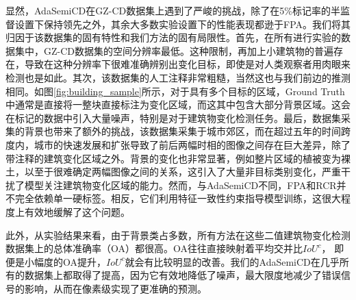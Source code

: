 \documentclass[lang=chs, degree=master, blindreview=false, adobe=false]{yanputhesis}
\begin{document}
显然，AdaSemiCD在GZ-CD数据集上遇到了严峻的挑战，除了在5$\%$标记率的半监督设置下保持领先之外，其余大多数实验设置下的性能表现都逊于FPA。我们将其归因于该数据集的固有特性和我们方法的固有局限性。首先，在所有进行实验的数据集中，GZ-CD数据集的空间分辨率最低。这种限制，再加上小建筑物的普遍存在，导致在这种分辨率下很难准确辨别出变化目标，即使是对人类观察者用肉眼来检测也是如此。其次，该数据集的人工注释非常粗糙，当然这也与我们前边的推测相同。如图\ref{fig:building_sample}所示，对于具有多个目标的区域，Ground Truth中通常是直接将一整块直接标注为变化区域，而这其中包含大部分背景区域。这会在标记的数据中引入大量噪声，特别是对于建筑物变化检测任务。最后，数据集采集的背景也带来了额外的挑战，该数据集采集于城市郊区，而在超过五年的时间跨度内，城市的快速发展和扩张导致了前后两幅时相的图像之间存在巨大差异，除了带注释的建筑变化区域之外。背景的变化也非常显著，例如整片区域的植被变为裸土，以至于很难确定两幅图像之间的关系，这引入了大量非目标类别变化，严重干扰了模型关注建筑物变化区域的能力。然而，与AdaSemiCD不同，FPA和RCR并不完全依赖单一硬标签。相反，它们利用特征一致性约束指导模型训练，这很大程度上有效地缓解了这个问题。

此外，从实验结果来看，由于背景类占多数，所有方法在这些二值建筑物变化检测数据集上的总体准确率（OA）都很高。OA往往直接映射着平均交并比$IoU^c$， 即便是小幅度的OA提升，$IoU^c$就会有比较明显的改善。我们的AdaSemiCD在几乎所有的数据集上都取得了提高，因为它有效地降低了噪声，最大限度地减少了错误信号的影响，从而在像素级实现了更准确的预测。
\end{document}
